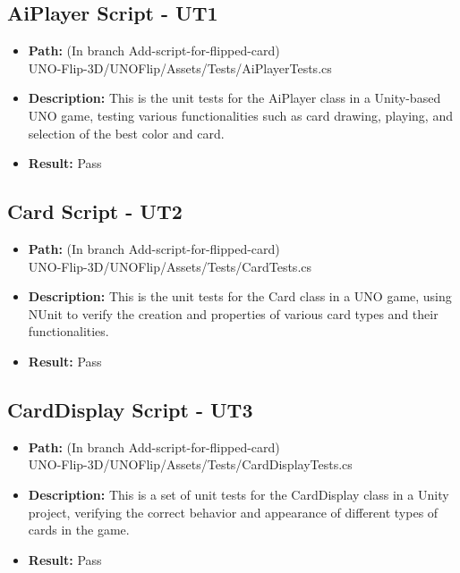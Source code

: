 \documentclass[12pt, titlepage]{article}
\begin{document}
\subsection{AiPlayer Script - UT1}
\begin{itemize}
    \item \textbf{Path:} (In branch Add-script-for-flipped-card) \\ UNO-Flip-3D/UNOFlip/Assets/Tests/AiPlayerTests.cs
    \item \textbf{Description:} This is the unit tests for the AiPlayer class in a Unity-based UNO game, testing various functionalities such as card drawing, playing, and selection of the best color and card.
    \item \textbf{Result:} Pass
\end{itemize}

\subsection{Card Script - UT2}
\begin{itemize}
    \item \textbf{Path:} (In branch Add-script-for-flipped-card) \\ UNO-Flip-3D/UNOFlip/Assets/Tests/CardTests.cs
    \item \textbf{Description:} This is the unit tests for the Card class in a UNO game, using NUnit to verify the creation and properties of various card types and their functionalities.
    \item \textbf{Result:} Pass
\end{itemize}

\subsection{CardDisplay Script - UT3}
\begin{itemize}
    \item \textbf{Path:} (In branch Add-script-for-flipped-card) \\ UNO-Flip-3D/UNOFlip/Assets/Tests/CardDisplayTests.cs
    \item \textbf{Description:} This is a set of unit tests for the CardDisplay class in a Unity project, verifying the correct behavior and appearance of different types of cards in the game.
    \item \textbf{Result:} Pass
\end{itemize}
\end{document}
